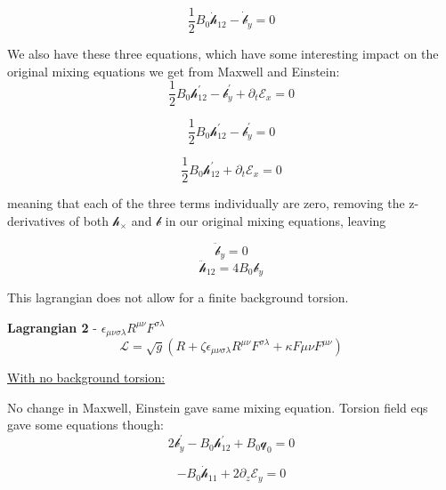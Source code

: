 \documentclass[letterpaper,12pt]{article}
\begin{document}
\begin{equation}
\frac{1}{2} B_0 \dot{\mathcal{h}}_{12} - \dot{\mathcal{b}}_y=0
\end{equation}

We also have these three equations, which have some interesting impact on the original mixing equations we get from Maxwell and Einstein:
\begin{equation}
\frac{1}{2} B_0 \mathcal{h}_{12}^{'}-\mathcal{b}_y^{'}+\partial_t \mathcal{E}_x=0
\end{equation}

\begin{equation}
\frac{1}{2} B_0 \mathcal{h}_{12}^{'}-\mathcal{b}_y^{'}=0
\end{equation}

\begin{equation}
\frac{1}{2} B_0 \mathcal{h}_{12}^{'}+\partial_t \mathcal{E}_x=0
\end{equation}

meaning that each of the three terms individually are zero, removing the z-derivatives of both $\mathcal{h}_{\times}$ and $\mathcal{b}$ in our original mixing equations, leaving

\begin{equation}
\ddot{ \mathcal{b}}_y=0
\end{equation}
\begin{equation}
\ddot{ \mathcal{h}}_{12} =4B_0 \mathcal{b}_y
\end{equation}


This lagrangian does not allow for a finite background torsion.


\textbf{Lagrangian 2} - $\epsilon_{\mu \nu \sigma \lambda} R^{\mu \nu} F^{\sigma \lambda}$
\begin{equation}
\mathcal{L}=\sqrt{g}(R+\zeta \epsilon_{\mu \nu \sigma \lambda} R^{\mu \nu} F^{\sigma \lambda}+\kappa F{\mu \nu}F^{\mu \nu})
\end{equation}

\underline{With no background torsion:}

No change in Maxwell, Einstein gave same mixing equation. Torsion field eqs gave some equations though:
\begin{equation}
2 \mathcal{b}_y^{'}-B_0\mathcal{h}_{12}^{'}+B_0\mathcal{q}_0=0
\end{equation}

\begin{equation}
-B_0\dot{\mathcal{h}}_{11}+2\partial_z\mathcal{E}_y=0
\end{equation}
\end{document}
